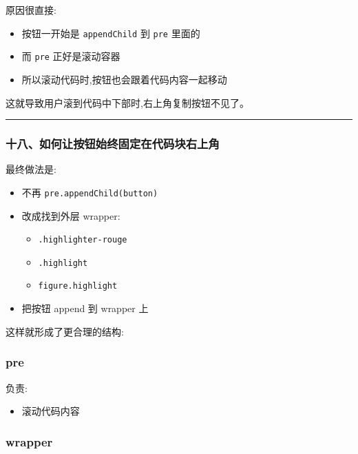 \documentclass[lang=cn,scheme=chinese,color=blue,device=normal,toc=onecol,math=cm]{elegantbook}
\begin{document}
原因很直接:\par


\begin{itemize}
\item 按钮一开始是 \texttt{appendChild} 到 \texttt{pre} 里面的
\item 而 \texttt{pre} 正好是滚动容器
\item 所以滚动代码时,按钮也会跟着代码内容一起移动
\end{itemize}


这就导致用户滚到代码中下部时,右上角复制按钮不见了。\par


\medskip\hrule\medskip


\subsubsection{十八、如何让按钮始终固定在代码块右上角}


最终做法是:\par


\begin{itemize}
\item 不再 \texttt{pre.appendChild(button)}
\item 改成找到外层 wrapper: 
\begin{itemize}
\item \texttt{.highlighter-rouge}
\item \texttt{.highlight}
\item \texttt{figure.highlight}
\end{itemize}
\item 把按钮 append 到 wrapper 上
\end{itemize}


这样就形成了更合理的结构:\par


\subsubsection{pre}


负责:\par


\begin{itemize}
\item 滚动代码内容
\end{itemize}


\subsubsection{wrapper}
\end{document}
